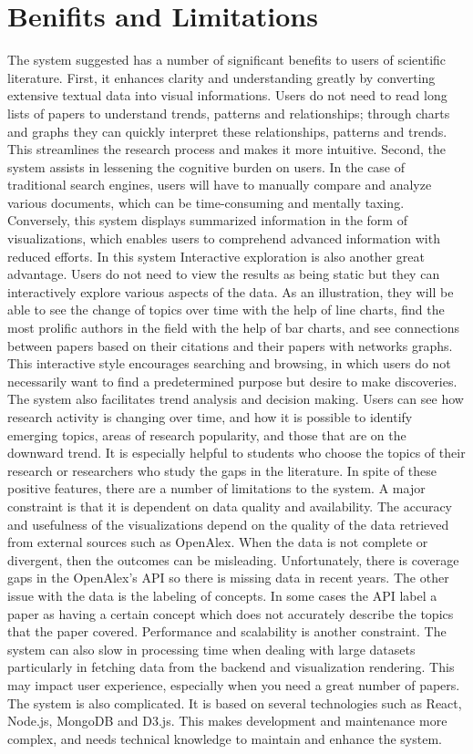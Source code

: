 \documentclass[sigconf]{acmart}
\begin{document}
\section{Benifits and Limitations}  
The system suggested has a number of significant benefits to users of scientific literature. First, it enhances clarity and understanding greatly by converting extensive textual data into visual informations. Users do not need to read long lists of papers to understand trends, patterns and relationships; through charts and graphs they can quickly interpret these relationships, patterns and trends. This streamlines the research process and makes it more intuitive. Second, the system assists in lessening the cognitive burden on users. In the case of traditional search engines, users will have to manually compare and analyze various documents, which can be time-consuming and mentally taxing. Conversely, this system displays summarized information in the form of visualizations, which enables users to comprehend advanced information with reduced efforts. In this system 
Interactive exploration is also another great advantage. Users do not need to view the results as being static but they can interactively explore various aspects of the data. As an illustration, they will be able to see the change of topics over time with the help of line charts, find the most prolific authors in the field with the help of bar charts, and see connections between papers based on their citations and their papers with networks graphs. This interactive style encourages searching and browsing, in which users do not necessarily want to find a predetermined purpose but desire to make discoveries. The system also facilitates trend analysis and decision making. Users can see how research activity is changing over time, and how it is possible to identify emerging topics, areas of research popularity, and those that are on the downward trend. It is especially helpful to students who choose the topics of their research or researchers who study the gaps in the literature. In spite of these positive features, there are a number of limitations to the system. A major constraint is that it is dependent on data quality and availability. The accuracy and usefulness of the visualizations depend on the quality of the data retrieved from external sources such as OpenAlex. When the data is not complete or divergent, then the outcomes can be misleading. Unfortunately, there is coverage gaps in the OpenAlex's API so there is missing data in recent years. The other issue with the data is the labeling of concepts. In some cases the API label a paper as having a certain concept which does not accurately describe the topics that the paper covered. Performance and scalability is another constraint. The system can also slow in processing time when dealing with large datasets particularly in fetching data from the backend and visualization rendering. This may impact user experience, especially when you need a great number of papers.  The system is also complicated. It is based on several technologies such as React, Node.js, MongoDB and D3.js. This makes development and maintenance more complex, and needs technical knowledge to maintain and enhance the system.
\end{document}
